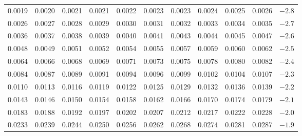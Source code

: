 \begin{table}[p]
\begin{center}
{\begin{tabular}{| rrrrr | rrrrr | c}
  \scriptsize{0.0019} & \scriptsize{0.0020} & \scriptsize{0.0021} & \scriptsize{0.0021} & \scriptsize{0.0022} & \scriptsize{0.0023} & \scriptsize{0.0023} & \scriptsize{0.0024} & \scriptsize{0.0025} & \scriptsize{0.0026} & $-2.8$ \\
  \scriptsize{0.0026} & \scriptsize{0.0027} & \scriptsize{0.0028} & \scriptsize{0.0029} & \scriptsize{0.0030} & \scriptsize{0.0031} & \scriptsize{0.0032} & \scriptsize{0.0033} & \scriptsize{0.0034} & \scriptsize{0.0035} & $-2.7$ \\
  \scriptsize{0.0036} & \scriptsize{0.0037} & \scriptsize{0.0038} & \scriptsize{0.0039} & \scriptsize{0.0040} & \scriptsize{0.0041} & \scriptsize{0.0043} & \scriptsize{0.0044} & \scriptsize{0.0045} & \scriptsize{0.0047} & $-2.6$ \\
  \scriptsize{0.0048} & \scriptsize{0.0049} & \scriptsize{0.0051} & \scriptsize{0.0052} & \scriptsize{0.0054} & \scriptsize{0.0055} & \scriptsize{0.0057} & \scriptsize{0.0059} & \scriptsize{0.0060} & \scriptsize{0.0062} & $-2.5$ \\
    \hline
  \scriptsize{0.0064} & \scriptsize{0.0066} & \scriptsize{0.0068} & \scriptsize{0.0069} & \scriptsize{0.0071} & \scriptsize{0.0073} & \scriptsize{0.0075} & \scriptsize{0.0078} & \scriptsize{0.0080} & \scriptsize{0.0082} & $-2.4$ \\
  \scriptsize{0.0084} & \scriptsize{0.0087} & \scriptsize{0.0089} & \scriptsize{0.0091} & \scriptsize{0.0094} & \scriptsize{0.0096} & \scriptsize{0.0099} & \scriptsize{0.0102} & \scriptsize{0.0104} & \scriptsize{0.0107} & $-2.3$ \\
  \scriptsize{0.0110} & \scriptsize{0.0113} & \scriptsize{0.0116} & \scriptsize{0.0119} & \scriptsize{0.0122} & \scriptsize{0.0125} & \scriptsize{0.0129} & \scriptsize{0.0132} & \scriptsize{0.0136} & \scriptsize{0.0139} & $-2.2$ \\
  \scriptsize{0.0143} & \scriptsize{0.0146} & \scriptsize{0.0150} & \scriptsize{0.0154} & \scriptsize{0.0158} & \scriptsize{0.0162} & \scriptsize{0.0166} & \scriptsize{0.0170} & \scriptsize{0.0174} & \scriptsize{0.0179} & $-2.1$ \\
  \scriptsize{0.0183} & \scriptsize{0.0188} & \scriptsize{0.0192} & \scriptsize{0.0197} & \scriptsize{0.0202} & \scriptsize{0.0207} & \scriptsize{0.0212} & \scriptsize{0.0217} & \scriptsize{0.0222} & \scriptsize{0.0228} & $-2.0$ \\
    \hline
    \hline
  \scriptsize{0.0233} & \scriptsize{0.0239} & \scriptsize{0.0244} & \scriptsize{0.0250} & \scriptsize{0.0256} & \scriptsize{0.0262} & \scriptsize{0.0268} & \scriptsize{0.0274} & \scriptsize{0.0281} & \scriptsize{0.0287} & $-1.9$ \\

\end{tabular}}
\end{center}
\end{table}
